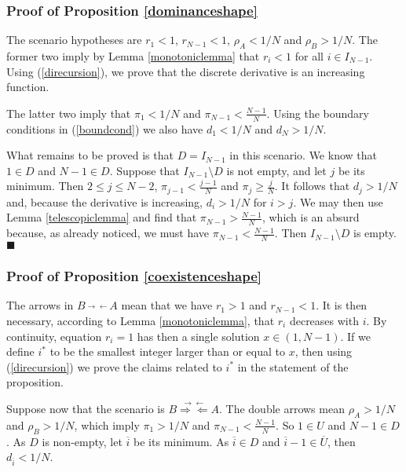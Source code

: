\documentclass[12pt]{article}
\begin{document}
\subsubsection{Proof of Proposition \ref{dominanceshape}}
\label{proofdominanceshape}
The scenario hypotheses are $r_1<1$, $r_{N-1}<1$, $\rho_A<1/N$ and $\rho_B>1/N$. The former two imply by Lemma \ref{monotoniclemma} that $r_i<1$ for all $i \in I_{N-1}$. Using (\ref{direcursion}), we prove that the discrete derivative is an increasing function.

The latter two imply that $\pi_1<1/N$ and $\pi_{N-1}<\frac{N-1}{N}$. Using the boundary conditions in (\ref{boundcond}) we also have $d_1<1/N$ and $d_N>1/N$.

What remains to be proved is that $D=I_{N-1}$ in this scenario. We know that $1 \in D$ and $N-1 \in D$. Suppose that $I_{N-1} \setminus D$ is not empty, and let $j$ be its minimum. Then $2 \leq j \leq N-2$, $\pi_{j-1}<\frac{j-1}{N}$ and $\pi_j \geq \frac{j}{N}$. It follows that $d_j>1/N$ and, because the derivative is increasing, $d_i>1/N$ for $i > j$. We may then use Lemma \ref{telescopiclemma} and find that $\pi_{N-1}>\frac{N-1}{N}$, which is an absurd because, as already noticed, we must have $\pi_{N-1}<\frac{N-1}{N}$. Then $I_{N-1} \setminus D$ is empty.
$\blacksquare$

\subsubsection{Proof of Proposition \ref{coexistenceshape}} \label{proofcoexistence}
The arrows in $B\stackrel{\rightarrow \leftarrow}{} A$ mean that we have $r_1>1$ and $r_{N-1}<1$. It is then necessary, according to Lemma \ref{monotoniclemma}, that $r_i$ decreases with $i$. By continuity, equation $r_i=1$ has then a single solution $x \in (1,N-1)$. If we define  $i^{\ast}$ to be the smallest integer larger than or equal to $x$, then using (\ref{direcursion}) we prove the claims related to $i^{\ast}$ in the statement of the proposition.

Suppose now that the scenario is $B\stackrel{\rightarrow \leftarrow}{\Rightarrow \Leftarrow} A$. The double arrows mean $\rho_A>1/N$ and $\rho_B>1/N$, which imply $\pi_1>1/N$ and  $\pi_{N-1}<\frac{N-1}{N}$. So $1 \in U$ and $N-1 \in D$. As $D$ is non-empty, let $\overline{i}$ be its minimum. As $\overline{i} \in D$ and $\overline{i}-1 \in \overline{U}$, then $d_{\overline{i}}<1/N$. 
\end{document}
